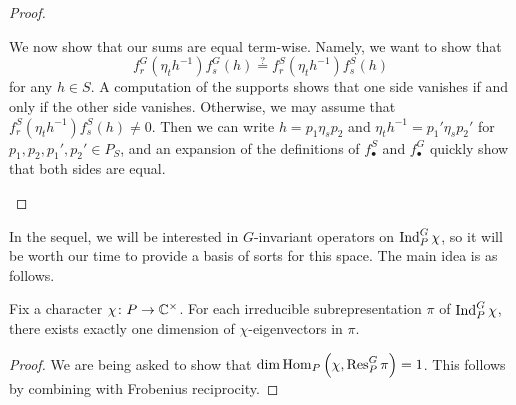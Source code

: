 \begin{proof}
\begin{itemize}
        We now show that our sums are equal term-wise. Namely, we want to show that
        \[f_r^G\left(\eta_th^{-1}\right)f_s^G(h)\stackrel?=f_r^S\left(\eta_th^{-1}\right)f_s^S(h)\]
        for any $h\in S$. A computation of the supports shows that one side vanishes if and only if the other side vanishes. Otherwise,
        we may assume that $f_r^S\left(\eta_th^{-1}\right)f_s^S(h)\ne0$. Then we can write $h=p_1\eta_sp_2$ and $\eta_th^{-1}=p_1'\eta_sp_2'$ for $p_1,p_2,p_1',p_2'\in P_S$, and an expansion of the definitions of $f_\bullet^S$ and $f_\bullet^G$ quickly show that both sides are equal.
        \qedhere
    \end{itemize}
\end{proof}
In the sequel, we will be interested in $G$-invariant operators on $\operatorname{Ind}^G_P\chi$, so it will be worth our time to provide a basis of sorts for this space. The main idea is as follows.
\begin{lemma} \label{lem:basis-of-ind}
	Fix a character $\chi\colon P\to\mathbb C^\times$. For each irreducible subrepresentation $\pi$ of $\operatorname{Ind}^G_P\chi$, there exists exactly one dimension of $\chi$-eigenvectors in $\pi$.
\end{lemma}
\begin{proof}
	We are being asked to show that $\dim\operatorname{Hom}_P\left(\chi,\operatorname{Res}^G_P\pi\right)=1$. This follows by combining  with Frobenius reciprocity.
\end{proof}
